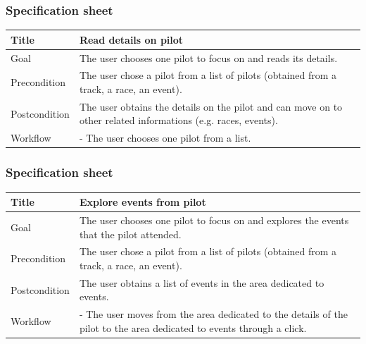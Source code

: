 \documentclass{beamer}
\begin{document}
\begin{frame}
    \frametitle{Specification sheet}
    \begin{table}
        \tiny
        \begin{tabular}{|p{2cm}|p{6cm}|}
        \hline
        Title & \textbf{Read details on pilot} \\
        \hline
        Goal & The user chooses one pilot to focus on and reads its details. \\
        \hline
        Precondition & The user chose a pilot from a list of pilots (obtained from a track, a race, an event).\\
        \hline
        Postcondition & The user obtains the details on the pilot and can move on to other related informations (e.g. races, events). \\
        \hline
        Workflow &
        - The user chooses one pilot from a list. \\
        \hline
        \end{tabular}
\end{table}
\end{frame}

\begin{frame}
    \frametitle{Specification sheet}
    \begin{table}
        \tiny
        \begin{tabular}{|p{2cm}|p{6cm}|}
        \hline
        Title & \textbf{Explore events from pilot} \\
        \hline
        Goal & The user chooses one pilot to focus on and explores the events that the pilot attended. \\
        \hline
        Precondition & The user chose a pilot from a list of pilots (obtained from a track, a race, an event).\\
        \hline
        Postcondition & The user obtains a list of events in the area dedicated to events. \\
        \hline
        Workflow &
        - The user moves from the area dedicated to the details of the pilot to the
        area dedicated to events through a click. \\
        \hline
        \end{tabular}
\end{table}
\end{frame}
\end{document}
